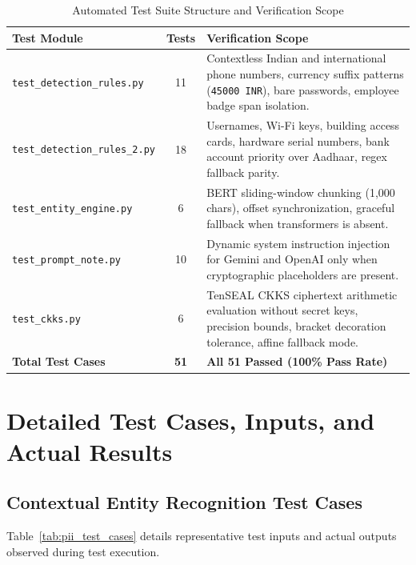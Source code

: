 \documentclass[12pt,a4paper,oneside]{report}
\numberwithin{equation}{chapter}
\begin{document}
\begin{table}[htbp]
\centering
\caption{Automated Test Suite Structure and Verification Scope}\label{tab:test_suites}
\begin{tabular}{p{}cp{}}
\toprule
\textbf{Test Module} & \textbf{Tests} & \textbf{Verification Scope} \\
\midrule
\texttt{test\_detection\_rules.py} & 11 & Contextless Indian and international phone numbers, currency suffix patterns (\texttt{45000 INR}), bare passwords, employee badge span isolation. \\
\texttt{test\_detection\_rules\_2.py} & 18 & Usernames, Wi-Fi keys, building access cards, hardware serial numbers, bank account priority over Aadhaar, regex fallback parity. \\
\texttt{test\_entity\_engine.py} & 6 & BERT sliding-window chunking (1,000 chars), offset synchronization, graceful fallback when transformers is absent. \\
\texttt{test\_prompt\_note.py} & 10 & Dynamic system instruction injection for Gemini and OpenAI only when cryptographic placeholders are present. \\
\texttt{test\_ckks.py} & 6 & TenSEAL CKKS ciphertext arithmetic evaluation without secret keys, precision bounds, bracket decoration tolerance, affine fallback mode. \\
\midrule
\textbf{Total Test Cases} & \textbf{51} & \textbf{All 51 Passed (100\% Pass Rate)} \\
\bottomrule
\end{tabular}
\end{table}

\section{Detailed Test Cases, Inputs, and Actual Results}

\subsection{Contextual Entity Recognition Test Cases}
Table~\ref{tab:pii_test_cases} details representative test inputs and actual outputs observed during test execution.
\end{document}

